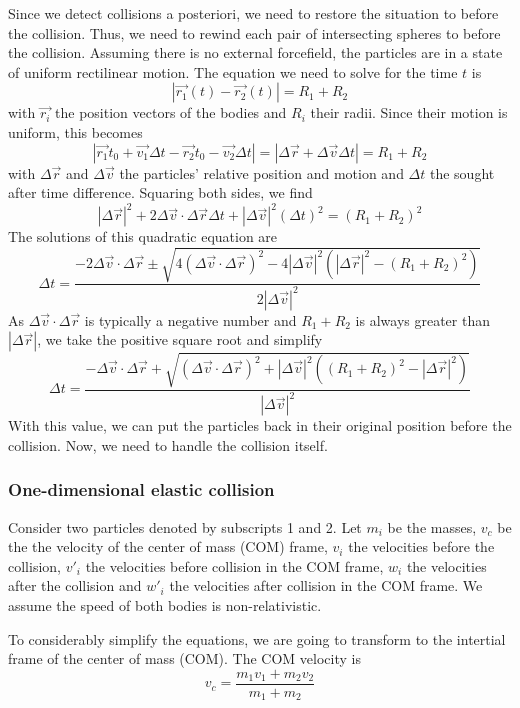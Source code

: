 Since we detect collisions a posteriori, we need to restore the situation to 
before the collision. Thus, we need to rewind each pair of intersecting spheres 
to before the collision. Assuming there is no external forcefield, the 
particles are in a state of uniform rectilinear motion. The equation we need to 
solve for the time $t$ is
$$
|\vec{r_1}(t) - \vec{r_2}(t)| = R_1 + R_2
$$
with $\vec{r_i}$ the position vectors of the bodies and $R_i$ their radii.  
Since their motion is uniform, this becomes
$$
|\vec{r_1}{t_0} + \vec{v_1}\Delta t - \vec{r_2}{t_0} - \vec{v_2}\Delta t| = | 
\Delta\vec{r} + \Delta\vec{v} \Delta t | = R_1 + R_2
$$
with $\Delta\vec{r}$ and $\Delta\vec{v}$ the particles' relative position and 
motion and $\Delta t$ the sought after time difference. Squaring both sides, we 
find
$$
|\Delta\vec{r}|^2 + 2\Delta\vec{v} \cdot \Delta\vec{r}\Delta t + 
|\Delta\vec{v}|^2(\Delta t)^2 = (R_1 + R_2)^2
$$
The solutions of this quadratic equation are
$$
\Delta t = \frac{-2\Delta\vec{v} \cdot \Delta\vec{r}
\pm \sqrt{4( \Delta\vec{v} \cdot \Delta\vec{r})^2 -
4|\Delta\vec{v}|^2 \left( |\Delta\vec{r}|^2 - (R_1 + R_2)^2 \right) }}
{2|\Delta\vec{v}|^2}
$$
As $\Delta\vec{v} \cdot \Delta\vec{r}$ is typically a negative number and 
$R_1 + R_2$ is always greater than $|\Delta\vec{r}|$, we take the positive 
square root and simplify
$$
\Delta t=\frac{-\Delta\vec{v} \cdot \Delta\vec{r} +
\sqrt{(\Delta\vec{v} \cdot \Delta\vec{r})^2 + |\Delta\vec{v}|^2
((R_1+R_2)^2 -|\Delta\vec{r}|^2)}}
{|\Delta\vec{v}|^2}
$$
With this value, we can put the particles back in their original position 
before the collision. Now, we need to handle the collision itself.

\subsubsection{One-dimensional elastic collision}

Consider two particles denoted by subscripts 1 and 2.  Let $m_i$ be the masses, 
$v_c$ be the the velocity of the center of mass (COM) frame, $v_i$ the 
velocities before the collision, $v'_i$ the velocities before collision in the 
COM frame, $w_i$ the velocities after the collision and $w'_i$ the velocities 
after collision in the COM frame.  We assume the speed of both bodies is 
non-relativistic. 

To considerably simplify the equations, we are going to transform to the 
intertial frame of the center of mass (COM). The COM velocity is
$$
v_c = \frac{m_1 v_1 + m_2 v_2}{m_1 + m_2}
$$

